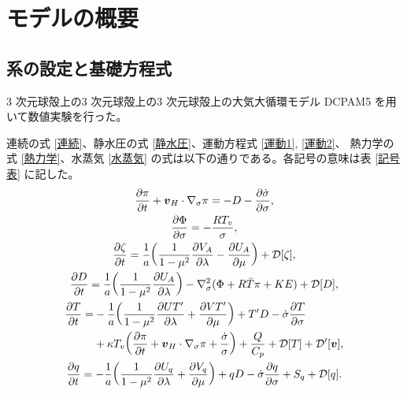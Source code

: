 \documentclass[body]{subfiles}
\begin{document}
\chapter{モデルの概要}

\section{系の設定と基礎方程式}
3 次元球殻上の3 次元球殻上の3 次元球殻上の大気大循環モデル DCPAM5 を用いて数値実験を行った。

連続の式 \eqref{連続}、静水圧の式 \eqref{静水圧}、運動方程式 \eqref{運動1}, \eqref{運動2}、
熱力学の式 \eqref{熱力学}、水蒸気 \eqref{水蒸気} の式は以下の通りである。各記号の意味は表
\ref{記号表} に記した。
\begin{gather}
	\pdv{\pi}{t}+\vb*{v}_H\cdot\nabla_\sigma\pi=-D-\pdv{\dot \sigma}{\sigma},\label{連続}\\
	\pdv{\Phi}{\sigma}=-\frac{RT_v}{\sigma},\label{静水圧}\\
	\pdv{\zeta}{t}=\frac{1}{a}\qty(\frac{1}{1-\mu^2}\pdv{V_A}{\lambda}-\pdv{U_A}{\mu})+\mathcal{D}[\zeta],\label{運動1}\\
	\pdv{D}{t}=\frac{1}{a}\qty(\frac{1}{1-\mu^2}\pdv{U_A}{\lambda})
		-\nabla^2_\sigma(\Phi+R\bar T\pi+KE)+\mathcal{D}[D],\label{運動2}\\
	\begin{split}
		\pdv{T}{t}=&-\frac{1}{a}\qty(\frac{1}{1-\mu^2}\pdv{UT'}{\lambda}+\pdv{VT'}{\mu})+T'D-\dot\sigma\pdv{T}{\sigma}\\
		&+\kappa T_v\qty(\pdv{\pi}{t}+\vb*{v}_H\cdot\nabla_\sigma\pi+\frac{\dot\sigma}{\sigma})
			+\frac{Q}{C_p}+\mathcal{D}[T]+\mathcal{D}'[\vb*{v}],
	\end{split}\label{熱力学}\\
	\pdv{q}{t}=-\frac{1}{a}\qty(\frac{1}{1-\mu^2}\pdv{U_q}{\lambda}+\pdv{V_q}{\mu})
		+qD-\dot\sigma\pdv{q}{\sigma}+S_q+\mathcal{D}[q].\label{水蒸気}
\end{gather}
\end{document}
